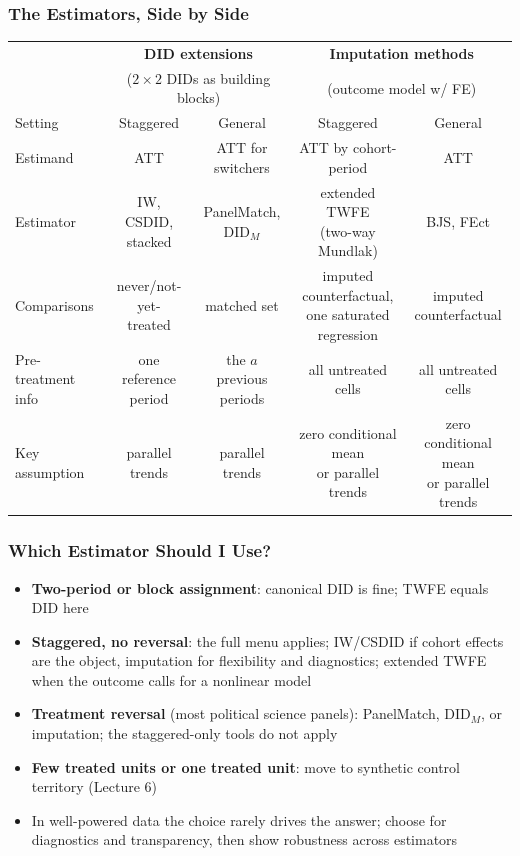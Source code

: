 \documentclass[xcolor=svgnames,9pt,english, aspectratio=169]{beamer}
\begin{document}
\begin{frame}
  \frametitle{The Estimators, Side by Side}
\begin{center}
\renewcommand{\arraystretch}{1.75}
\small
\begin{tabular}{lcccc}
 & \multicolumn{2}{c}{\textbf{DID extensions}} & \multicolumn{2}{c}{\textbf{Imputation methods}} \\
 & \multicolumn{2}{c}{\footnotesize ($2\times2$ DIDs as building blocks)} & \multicolumn{2}{c}{\footnotesize (outcome model w/ FE)} \\ \hline
Setting & Staggered & General & Staggered & General \\
Estimand & ATT & ATT for switchers & ATT by cohort-period & ATT \\
Estimator & IW, CSDID, stacked & PanelMatch, DID$_M$ & \makecell{extended TWFE\\(two-way Mundlak)} & BJS, FEct \\
Comparisons & \makecell{never/not-yet-\\treated} & matched set & \makecell{imputed counterfactual,\\one saturated regression} & \makecell{imputed\\counterfactual} \\
Pre-treatment info & one reference period & the $a$ previous periods & all untreated cells & all untreated cells \\
Key assumption & parallel trends & parallel trends & \makecell{zero conditional mean\\or parallel trends} & \makecell{zero conditional mean\\or parallel trends} \\ \hline
\end{tabular}
\end{center}
\end{frame}

\begin{frame}
  \frametitle{Which Estimator Should I Use?}
\begin{itemize}[<+->]\itemsep1em
\item \textbf{Two-period or block assignment}: canonical DID is fine; TWFE equals DID here
\item \textbf{Staggered, no reversal}: the full menu applies; IW/CSDID if cohort effects are the object, imputation for flexibility and diagnostics; extended TWFE when the outcome calls for a nonlinear model
\item \textbf{Treatment reversal} (most political science panels): PanelMatch, DID$_M$, or imputation; the staggered-only tools do not apply
\item \textbf{Few treated units or one treated unit}: move to synthetic control territory (Lecture 6)
\item In well-powered data the choice rarely drives the answer; choose for \alert{diagnostics and transparency}, then show robustness across estimators
\end{itemize}
\end{frame}
\end{document}
